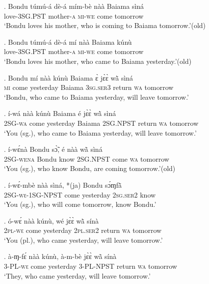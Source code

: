 \documentclass{assets/fieldnotes}
\begin{document}

\exg. Bondu túmú-á dè-á mím-bè nàà Baiama sìná \\
{} love-\textsc{3SG.PST} mother-\textsc{a} \textsc{mi-we} come {} tomorrow\\
`Bondu loves his mother, who is coming to Baiama tomorrow.’\hfill{(old)}

\exg. Bondu túmú-á dè-á mí nàà Baiama kúnù\\
{} love-\textsc{3SG.PST} mother-\textsc{a} \textsc{mi-we} come {} tomorrow\\
`Bondu loves his mother, who came to Baiama yesterday.’\hfill{(old)}

\exg. Bondu mí nàà kúnù Baiama ɛ̀ jɛ̀ɛ̀ wã̀ sìná \\
{} \textsc{mi} come yesterday Baiama \textsc{3sg.ser3} return \textsc{wa} tomorrow\\
`Bondu, who came to Baiama yesterday, will leave tomorrow.’

\exg. í-wá nàà kúnù Baiama é jɛ̀ɛ̀ wã̀ sìná\\
\textsc{2SG-wa} come yesterday Baiama \textsc{2SG.NPST} return \textsc{wa} tomorrow\\
`You (sg.), who came to Baiama yesterday, will leave tomorrow.’

\exg. í-wɛ́nà Bondu sɔ̃̀, é nàà wã̀ sìná\\
\textsc{2SG}-\textsc{wena} Bondu know \textsc{2SG.NPST} come \textsc{wa} tomorrow\\
`You (sg.), who know Bondu, are coming tomorrow.’\hfill{(old)}

\exg. í-wɛ́-mbè nàà sìná, *(ja) Bondu sɔ́ɱfã̀\\
\textsc{2SG-wɛ-1SG-NPST} come yesterday \textsc{2sg.ser2} {} know\\
`You (sg.), who will come tomorrow, know Bondu.’

\exg. ó-wɛ́ nàà kúnù, wé jɛ̀ɛ̀ wã̀ sínà \\
\textsc{2pl-wɛ} come yesterday \textsc{2pl.ser2} return \textsc{wa} tomorrow\\
`You (pl.), who came yesterday, will leave tomorrow.’

\exg. à-ɱ-fɛ́ nàà kúnù, à-m-bè jɛ̀ɛ̀ wã̀ sínà \\
\textsc{3-PL-wɛ} come yesterday \textsc{3-PL-NPST} return \textsc{wa} tomorrow\\
`They, who came yesterday, will leave tomorrow.’
\end{document}
